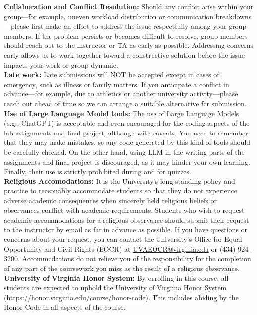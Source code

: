 \documentclass[12pt]{article}
\begin{document}
\noindent
\textbf{Collaboration and Conflict Resolution:} Should any conflict arise within your group—for example, uneven workload distribution or communication breakdowns—please first make an effort to address the issue respectfully among your group members. If the problem persists or becomes difficult to resolve, group members should reach out to the instructor or TA as early as possible. Addressing concerns early allows us to work together toward a constructive solution before the issue impacts your work or group dynamic. \\[2pt]

\noindent
\textbf{Late work:} Late submissions will NOT be accepted except in cases of emergency, such as illness or family matters. If you anticipate a conflict in advance—for example, due to athletics or another university activity—please reach out ahead of time so we can arrange a suitable alternative for submission. \\[2pt]

\noindent
\textbf{Use of Large Language Model tools:} The use of Large Language Models (e.g., ChatGPT) is acceptable and even encouraged for the coding aspects of the lab assignments and final project, although with caveats. You need to remember that they may make mistakes, so any code generated by this kind of tools should be carefully checked. On the other hand, using LLM in the writing parts of the assignments and final project is discouraged, as it may hinder your own learning. Finally, their use is strictly prohibited during and for quizzes. \\[2pt]

\noindent
\textbf{Religious Accomodations:} It is the University's long-standing policy and practice to reasonably accommodate students so that they do not experience adverse academic consequences when sincerely held religious beliefs or observances conflict with academic requirements. Students who wish to request academic accommodations for a religious observance should submit their request to the instructor by email as far in advance as possible.  If you have questions or concerns about your request, you can contact the University's Office for Equal Opportunity and Civil Rights (EOCR) at \href{mailto:UVAEOCR@virginia.edu}{UVAEOCR@virginia.edu} or (434) 924-3200. Accommodations do not relieve you of the responsibility for the completion of any part of the coursework you miss as the result of a religious observance. \\[2pt]

\noindent
\textbf{University of Virginia Honor System:} By enrolling in this course, all students are expected to uphold the University of Virginia Honor System (\url{https://honor.virginia.edu/course/honor-code}). This includes abiding by the Honor Code in all aspects of the course. \\[2pt]
\end{document}

